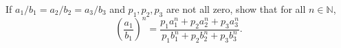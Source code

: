 If $a_1/b_1=a_2/b_2=a_3/b_3$ and $p_1,p_2,p_3$ are not all zero, show that for all $n\in\mathbb{N}$,  \[ \left(\frac{a_1}{b_1}\right)^n = \frac{p_1a_1^n+p_2a_2^n+p_3a_3^n}{p_1b_1^n+p_2b_2^n+p_3b_3^n}. \]
